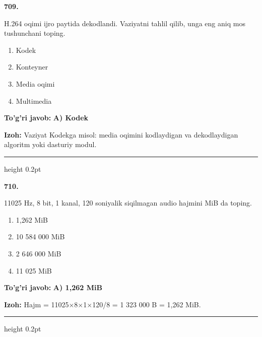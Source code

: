\documentclass[10pt,a4paper,oneside]{article}
\begin{document}
\noindent\textbf{\color{ink}709.}
\par
H.264 oqimi ijro paytida dekodlandi. Vaziyatni tahlil qilib, unga eng aniq mos tushunchani toping.
\begin{enumerate}[label=\Alph*),leftmargin=9mm]
\item Kodek
\item Konteyner
\item Media oqimi
\item Multimedia
\end{enumerate}
\begin{tcolorbox}[enhanced,breakable,colback=teal!4,colframe=teal!50!black,boxrule=0.5pt,arc=1.1mm,left=3mm,right=3mm,top=1.7mm,bottom=1.7mm,before skip=2mm,after skip=2mm]
\textbf{\color{teal}To'g'ri javob:} \textbf{A) Kodek}
\par\smallskip
\textbf{Izoh:} Vaziyat Kodekga misol: media oqimini kodlaydigan va dekodlaydigan algoritm yoki dasturiy modul.
\end{tcolorbox}
\vspace{2mm}\hrule height 0.2pt \vspace{3mm}

\noindent\textbf{\color{ink}710.}
\par
11025 Hz, 8 bit, 1 kanal, 120 soniyalik siqilmagan audio hajmini MiB da toping.
\begin{enumerate}[label=\Alph*),leftmargin=9mm]
\item 1,262 MiB
\item 10 584 000 MiB
\item 2 646 000 MiB
\item 11 025 MiB
\end{enumerate}
\begin{tcolorbox}[enhanced,breakable,colback=teal!4,colframe=teal!50!black,boxrule=0.5pt,arc=1.1mm,left=3mm,right=3mm,top=1.7mm,bottom=1.7mm,before skip=2mm,after skip=2mm]
\textbf{\color{teal}To'g'ri javob:} \textbf{A) 1,262 MiB}
\par\smallskip
\textbf{Izoh:} Hajm = 11025\ensuremath{\times}8\ensuremath{\times}1\ensuremath{\times}120/8 = 1 323 000 B = 1,262 MiB.
\end{tcolorbox}
\vspace{2mm}\hrule height 0.2pt \vspace{3mm}
\end{document}
